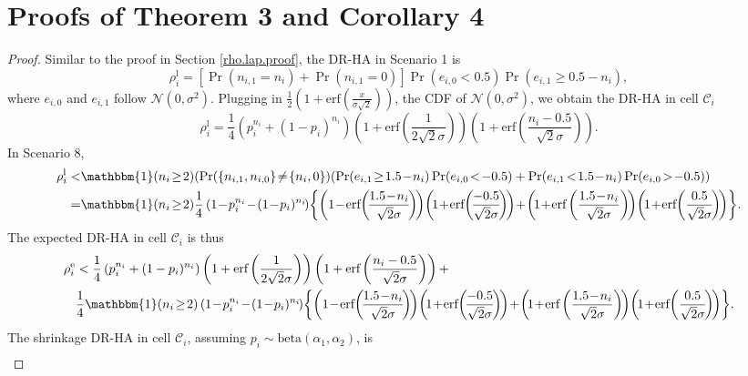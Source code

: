 \documentclass[10pt,journal,compsoc]{IEEEtran}
\newcommand{\C}{\mathcal{C}}
\begin{document}
\section{\large  Proofs of Theorem 3 and Corollary 4} \label{rho.gau.proof}
\begin{proof}
Similar to the proof in Section \ref{rho.lap.proof}, the DR-HA in Scenario 1
is 
$$\rho^{\text{l}}_i=[\Pr(n_{i,1}=n_i)+\Pr(n_{i,1}=0)]\Pr(e_{i,0}<0.5)\Pr(e_{i,1}\ge0.5-n_i),$$ 
where $e_{i,0}$ and $e_{i,1}$ follow $\mathcal{N}(0,\sigma^2)$. Plugging in  $\frac{1}{2}(1+\mbox{erf}(\frac{x}{\sigma\sqrt{2}}))$, the CDF of $\mathcal{N}(0,\sigma^2)$, we obtain the DR-HA in cell $\C_i$ $$\rho^{\text{l}}_i=\frac{1}{4}\left(p_i^{n_i}+(1-p_i)^{n_i}\right)\left(1+\mbox{erf}\left(\frac{1}{2\sqrt{2}\sigma}\right)\right)\left(1+\mbox{erf}\left(\frac{n_i-0.5}{\sqrt{2}\sigma}\right)\right).$$
In Scenario 8,
\begin{align*}
\rho^{\text{l}}_i<&\mathbbm{1}(n_i\!\ge\!2)(\Pr(\{n_{i,1}, n_{i,0}\}\!\neq\!\{n_i,0\})(\Pr(e_{i,1}\!\geq\!1.5\!-\!n_i)\Pr(e_{i,0}\!<\!-0.5)+\Pr(e_{i,1}\!<\!1.5\!-\!n_i)\Pr(e_{i,0}\!>\!-0.5))\\
=&\mathbbm{1}(n_i\!\ge\!2)\frac{1}{4}\left(1\!-\!p_i^{n_i}\!-\!(1\!-\!p_i)^{n_i}\!\right)\!\bigg\{\!\left(1\!-\!\mbox{erf}\!\left(\!\frac{1.5\!-\!n_i}{\sqrt{2}\sigma}\!\right)\!\right)\!\left(\!1\!+\!\mbox{erf}\!\left(\!\frac{-0.5}{\sqrt{2}\sigma}\!\right)\!\right)\!+\!\left(\!1\!+\!\mbox{erf}\left(\frac{1.5\!-\!n_i}{\sqrt{2}\sigma}\right)\!\right)\!\left(\!1\!+\!\mbox{erf}\!\left(\frac{0.5}{\sqrt{2}\sigma}\!\right)\!\right)\!\bigg\}.
\end{align*}
The expected DR-HA in cell $\C_i$ is thus
\begin{align*}
\rho^{\text{e}}_i&<\frac{1}{4}\left(p_i^{n_i}+(1-p_i)^{n_i}\right)\left(1+\mbox{erf}\left(\frac{1}{2\sqrt{2}\sigma}\right)\right)\left(1+\mbox{erf}\left(\frac{n_i-0.5}{\sqrt{2}\sigma}\right)\right)+\\
&\frac{1}{4}\mathbbm{1}(n_i\!\ge\!2)\left(1\!-\!p_i^{n_i}\!-\!(1\!-\!p_i)^{n_i}\!\right)\!\bigg\{\!\left(1\!-\!\mbox{erf}\!\left(\!\frac{1.5\!-\!n_i}{\sqrt{2}\sigma}\!\right)\!\right)\!\left(\!1\!+\!\mbox{erf}\!\left(\!\frac{-0.5}{\sqrt{2}\sigma}\!\right)\!\right)\!+\!\left(\!1\!+\!\mbox{erf}\left(\frac{1.5\!-\!n_i}{\sqrt{2}\sigma}\right)\!\right)\!\left(\!1\!+\!\mbox{erf}\!\left(\frac{0.5}{\sqrt{2}\sigma}\!\right)\!\right)\!\bigg\}.
\end{align*}
The shrinkage DR-HA in cell $\C_i$, assuming $p_i\sim\mbox{beta}(\alpha_1,\alpha_2)$, is 
\small \begin{align*}

\end{align*}
\end{proof}
\end{document}
